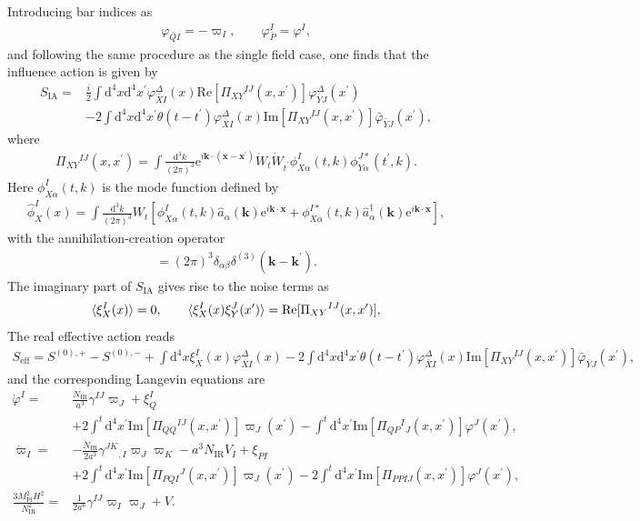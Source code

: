 \documentclass[aps, prd
, preprint
, nofootinbib 
]{revtex4-1}
\newcommand{\dd}{\mathrm{d}}
\newcommand{\ee}{\mathrm{e}}
\newcommand{\Mpl}{M_\text{Pl}}
\newcommand{\IR}{\text{IR}}
\renewcommand{\Re}{\mathrm{Re}}
\renewcommand{\Im}{\mathrm{Im}}
\newcommand{\dk}{\frac{\dd^3k}{(2\pi)^3}}
\newcommand{\SIA}{S_\text{IA}}
\newcommand{\bae}[1]{\begin{align} #1 \end{align}}
\begin{document}
Introducing bar indices as
\bae{
	\varphi_{\bar{Q}I}=-\varpi_I, \quad\quad \varphi_{\bar{P}}^I=\varphi^I,
}
and following the same procedure as the single field case, one finds that the influence action is given by
\bae{
	\SIA=&\frac{i}{2}\int\dd^4x\dd^4x^\prime\varphi^\Delta_{\bar{X}I}(x)\Re[\Pi_{XY}{}^{IJ}(x,x^\prime)]\varphi^\Delta_{\bar{Y}J}(x^\prime) \nonumber \\
	&-2\int\dd^4x\dd^4x^\prime\theta(t-t^\prime)\varphi^\Delta_{\bar{X}I}(x)\Im[\Pi_{XY}{}^{IJ}(x,x^\prime)]\bar{\varphi}_{\bar{Y}J}(x^\prime),
}
where
\bae{
	\Pi_{XY}{}^{IJ}(x,x^\prime)=\int\dk\ee^{i\mathbf{k}\cdot(\mathbf{x}-\mathbf{x}^\prime)}\dot{W}_t\dot{W}_{t^\prime}
	\phi_{X\alpha}^I(t,k)\phi_{Y\alpha}^{J*}(t^\prime,k).
}
Here $\phi_{X\alpha}^I(t,k)$ is the mode function defined by
\bae{
	\hat{\phi}_X^I(x)=\int\dk W_t\left[\phi_{X\alpha}^I(t,k)\hat{a}_\alpha(\mathbf{k})\ee^{i\mathbf{k}\cdot\mathbf{x}}
	+\phi_{X\alpha}^{I*}(t,k)\hat{a}^\dagger_\alpha(\mathbf{k})\ee^{i\mathbf{k}\cdot\mathbf{x}}\right],
}
with the annihilation-creation operator
\bae{
	[\hat{a}_\alpha(\mathbf{k}),\hat{a}^\dagger_\beta(\mathbf{k^\prime})]=(2\pi)^3\delta_{\alpha\beta}\delta^{(3)}(\mathbf{k}-\mathbf{k}^\prime).
}
The imaginary part of $\SIA$ gives rise to the noise terms as
\bae{
	\braket{\xi_X^I(x)}=0, \quad\quad \braket{\xi_X^I(x)\xi_Y^J(x^\prime)}=\Re[\Pi_{XY}{}^{IJ}(x,x^\prime)],
}
The real effective action reads
\bae{
	S_\text{eff}=S^{(0),+}-S^{(0),-}+\int\dd^4x\xi_X^I(x)\varphi^\Delta_{\bar{X}I}(x)
	-2\int\dd^4x\dd^4x^\prime\theta(t-t^\prime)\varphi^\Delta_{\bar{X}I}(x)\Im[\Pi_{XY}{}^{IJ}(x,x^\prime)]\bar{\varphi}_{\bar{Y}J}(x^\prime),
}
and the corresponding Langevin equations are
\bae{
	\dot{\varphi}^I=&\frac{N_\IR}{a^3}\gamma^{IJ}\varpi_J+\xi_Q^I \nonumber \\
	&+2\int^t\dd^4x^\prime\Im[\Pi_{QQ}{}^{IJ}(x,x^\prime)]\varpi_J(x^\prime)
	-\int^t\dd^4x^\prime\Im[\Pi_{QP}{}^I{}_J(x,x^\prime)]\varphi^J(x^\prime), \\
	\dot{\varpi}_I=&-\frac{N_\IR}{2a^3}\gamma^{JK}{}_{,I}\varpi_J\varpi_K-a^3N_\IR V_I+\xi_{PI} \nonumber \\
	&+2\int^t\dd^4x^\prime\Im[\Pi_{PQI}{}^J(x,x^\prime)]\varpi_J(x^\prime)-2\int^t\dd^4x^\prime\Im[\Pi_{PPIJ}(x,x^\prime)]\varphi^J(x^\prime), \\
	\frac{3\Mpl^2H^2}{N_\IR^2}=&\frac{1}{2a^6}\gamma^{IJ}\varpi_I\varpi_J+V.
}
\end{document}
